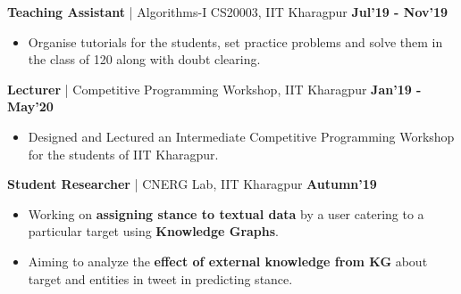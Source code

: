 \documentclass[10pt]{article}
\begin{document}
\vspace{-0.1ex}
{\color{headliner} \spacedhrule{0.15ex}{1.0ex}}
\large { \textbf{Teaching Assistant} | Algorithms-I CS20003, IIT Kharagpur} \normalsize
\href{https://github.com/shmundhra/Credentials/tree/master/Teaching\%20Ventures} {\hspace{0.5ex}\faMousePointer}
{\hfill} \textbf{Jul'19 - Nov'19}\\[-1.9em]
\begin{itemize}
    \item Organise tutorials for the students, set practice problems and solve them in the class of 120 along with doubt clearing.\\[-1.25em]
\end{itemize}
\large { \textbf{Lecturer} | Competitive Programming Workshop, IIT Kharagpur} \normalsize
\href{https://github.com/shmundhra/Credentials/tree/master/Teaching\%20Ventures} {\hspace{0.5ex}\faMousePointer}
{\hfill} \textbf{Jan'19 - May'20}\\[-1.9em]
\begin{itemize}
    \item Designed and Lectured an Intermediate Competitive Programming Workshop for the students of IIT Kharagpur.\\[-2em]
\end{itemize}

\vspace{-0.1ex}
{\color{headliner} \spacedhrule{0.15ex}{1.0ex}}
\large {\textbf{Student Researcher} | CNERG Lab, IIT Kharagpur} \normalsize
\href{}{}
{\hfill} \textbf{Autumn'19}\\[-1.75em]
\begin{itemize}
    \item Working on \textbf{assigning stance to textual data} by a user catering to a particular target using \textbf{Knowledge Graphs}.\\[-1.9em]
    \item Aiming to analyze the \textbf{effect of external knowledge from KG} about target and entities in tweet in predicting stance.\\[-2em]
\end{itemize}
\end{document}
